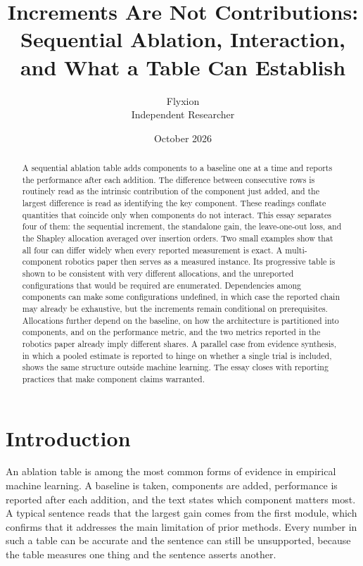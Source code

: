 \documentclass[11pt]{article}
\title{Increments Are Not Contributions:\\Sequential Ablation, Interaction, and What a Table Can Establish}
\author{Flyxion\\Independent Researcher}
\date{October 2026}
\theoremstyle{plain}
\theoremstyle{remark}
\begin{document}
\maketitle

\begin{abstract}
A sequential ablation table adds components to a baseline one at a time and reports the performance after each addition. The difference between consecutive rows is routinely read as the intrinsic contribution of the component just added, and the largest difference is read as identifying the key component. These readings conflate quantities that coincide only when components do not interact. This essay separates four of them: the sequential increment, the standalone gain, the leave-one-out loss, and the Shapley allocation averaged over insertion orders. Two small examples show that all four can differ widely when every reported measurement is exact. A multi-component robotics paper then serves as a measured instance. Its progressive table is shown to be consistent with very different allocations, and the unreported configurations that would be required are enumerated. Dependencies among components can make some configurations undefined, in which case the reported chain may already be exhaustive, but the increments remain conditional on prerequisites. Allocations further depend on the baseline, on how the architecture is partitioned into components, and on the performance metric, and the two metrics reported in the robotics paper already imply different shares. A parallel case from evidence synthesis, in which a pooled estimate is reported to hinge on whether a single trial is included, shows the same structure outside machine learning. The essay closes with reporting practices that make component claims warranted.
\end{abstract}

\section{Introduction}

An ablation table is among the most common forms of evidence in empirical machine learning. A baseline is taken, components are added, performance is reported after each addition, and the text states which component matters most. A typical sentence reads that the largest gain comes from the first module, which confirms that it addresses the main limitation of prior methods. Every number in such a table can be accurate and the sentence can still be unsupported, because the table measures one thing and the sentence asserts another.
\end{document}

